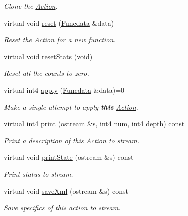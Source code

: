 \begin{DoxyCompactItemize}
\begin{DoxyCompactList}\small\item\em Clone the \mbox{\hyperlink{class_action}{Action}}. \end{DoxyCompactList}\item 
virtual void \mbox{\hyperlink{class_action_ac7c1cf16bb63e0741ba16be5179cf943}{reset}} (\mbox{\hyperlink{class_funcdata}{Funcdata}} \&data)
\begin{DoxyCompactList}\small\item\em Reset the \mbox{\hyperlink{class_action}{Action}} for a new function. \end{DoxyCompactList}\item 
virtual void \mbox{\hyperlink{class_action_a8ac616ae7f497202746a92c95e32821d}{reset\+Stats}} (void)
\begin{DoxyCompactList}\small\item\em Reset all the counts to zero. \end{DoxyCompactList}\item 
virtual int4 \mbox{\hyperlink{class_action_aac1c3999d6c685b15f5d9765a4d04173}{apply}} (\mbox{\hyperlink{class_funcdata}{Funcdata}} \&data)=0
\begin{DoxyCompactList}\small\item\em Make a single attempt to apply {\bfseries{this}} \mbox{\hyperlink{class_action}{Action}}. \end{DoxyCompactList}\item 
virtual int4 \mbox{\hyperlink{class_action_a0f7c833f74d267d7fbc50fa9e0f2a964}{print}} (ostream \&s, int4 num, int4 depth) const
\begin{DoxyCompactList}\small\item\em Print a description of this \mbox{\hyperlink{class_action}{Action}} to stream. \end{DoxyCompactList}\item 
virtual void \mbox{\hyperlink{class_action_a8c64348dc5e9ad6ba914cf74aaac8bfb}{print\+State}} (ostream \&s) const
\begin{DoxyCompactList}\small\item\em Print status to stream. \end{DoxyCompactList}\item 
virtual void \mbox{\hyperlink{class_action_a4a1ebee11b29baa171cbd1dc1d597006}{save\+Xml}} (ostream \&s) const
\begin{DoxyCompactList}\small\item\em Save specifics of this action to stream. \end{DoxyCompactList}\item 

\end{DoxyCompactItemize}
